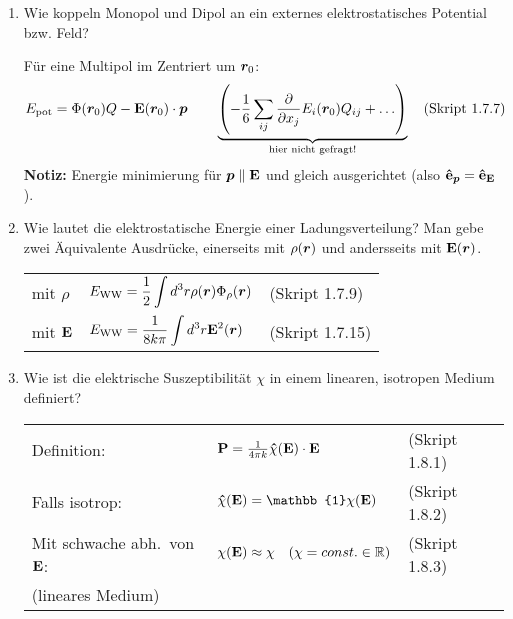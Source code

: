 \begin{enumerate}
  \item Wie koppeln Monopol und Dipol an ein externes elektrostatisches
        Potential bzw. Feld?
        
        Für eine Multipol im Zentriert um $\vb* r_0$:
        $$E_{\text{pot}}=\Phi(\vb* r_0)Q-\vb E(\vb* r_0)\cdot\vb* p 
        \qquad
        \underbrace{\qty(-\frac{1}{6}\sum_{ij}\pdv{x_j}E_i(\vb* r_0)Q_{ij}
        +\ldots)}_{\text{hier nicht gefragt!}}
        \quad\text{(Skript 1.7.7)}$$
        \textbf{Notiz:} Energie minimierung für $\vb* p\parallel \vb E$
        und gleich ausgerichtet (also $\vu e_{\vb* p}=\vu e_{\vb E}$).\\

  \clearpage
  \item Wie lautet die elektrostatische Energie einer Ladungsverteilung?
        Man gebe zwei Äquivalente Ausdrücke, einerseits mit $\rho(\vb* r)$
        und andersseits mit $\vb E(\vb* r)$.
        \begin{center}
        \begin{tabular}{lll}
          mit $\rho$    & $\displaystyle E_{\text{WW}}=
                          \frac{1}{2}\int d^3 r\rho(\vb* r)
                          \Phi_\rho(\vb* r)$
                            &(Skript 1.7.9)\\
          mit $\vb E$   & $\displaystyle E_{\text{WW}}=\frac{1}{8k\pi}
                           \int d^3 r\vb E^2(\vb* r)$
                            &(Skript 1.7.15)\\
        \end{tabular}
        \end{center}

  \item Wie ist die elektrische Suszeptibilität $\chi$ in einem 
        linearen, isotropen Medium definiert?
        \begin{center}
        \begin{tabular}{lll}
          Definition:             
          & $\vb P = \frac{1}{4\pi k} 
            \vu \chi(\vb E)\cdot \vb E\quad$
          & (Skript 1.8.1) \\
          Falls isotrop: 
          & $\vu\chi(\vb E)=
            \mathbb{1}\chi(\vb E)$
          & (Skript 1.8.2) \\
          Mit schwache abh.\ von $\vb E$:
          & $\chi(\vb E)\approx\chi
          \quad(\chi=const.\in\mathbb{R})$
            & (Skript 1.8.3) \\
          (lineares Medium)
        \end{tabular}
        \end{center}


\end{enumerate}
